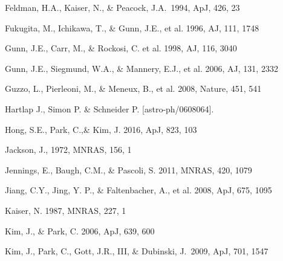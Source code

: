 \documentclass[iop]{emulateapj}
\begin{document}
\begin{thebibliography}{}
Feldman, H.A., Kaiser, N., \& Peacock, J.A.\ 1994, ApJ, 426, 23 

Fukugita, M., Ichikawa, T., \& Gunn, J.E., et al. 1996, AJ, 111, 1748





Gunn, J.E., Carr, M., \& Rockosi, C. et al. 1998, AJ, 116, 3040

Gunn, J.E., Siegmund, W.A., \& Mannery, E.J., et al. 2006, AJ, 131, 2332

Guzzo, L., Pierleoni, M., \& Meneux, B., et al. 2008, Nature, 451, 541

Hartlap J., Simon P. \& Schneider P. [astro-ph/0608064].


Hong, S.E., Park, C.,\&  Kim, J. 2016, ApJ, 823, 103

Jackson, J., 1972, MNRAS, 156, 1

Jennings, E., Baugh, C.M., \& Pascoli, S. 2011, MNRAS, 420, 1079  


Jiang, C.Y., Jing, Y. P., \& Faltenbacher, A., et al. 2008, ApJ, 675, 1095

Kaiser, N. 1987, MNRAS, 227, 1


Kim, J., \& Park, C. 2006, ApJ, 639, 600  

Kim, J., Park, C., Gott, J.R., III, \& Dubinski, J.\ 2009, ApJ, 701, 1547 


\end{thebibliography}
\end{document}
